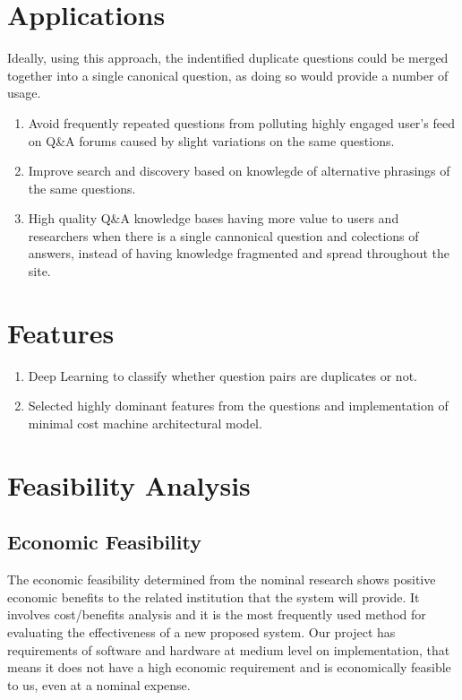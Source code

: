 \section{Applications}
Ideally, using this approach, the indentified duplicate questions could be merged together into a single canonical question, as doing so would provide a number of usage.  
\begin{enumerate}
	\item Avoid frequently repeated questions from polluting highly engaged user's feed on Q\&A forums caused by slight variations on the same questions.
	\item Improve search and discovery based on knowlegde of alternative phrasings of the same questions.
	\item High quality Q\&A knowledge bases having more value to users and researchers when there is a single cannonical question and colections of answers, instead of having knowledge fragmented and spread throughout the site.
\end{enumerate}


\section{Features}
\begin{enumerate}
\item Deep Learning to classify whether question pairs are duplicates or not.
\item Selected highly dominant features from the questions and implementation of minimal cost machine architectural model.
\end{enumerate}


\section{Feasibility Analysis}
\subsection{Economic Feasibility}
The economic feasibility determined from the nominal research shows positive economic benefits to the related institution that the system will provide. It involves cost/benefits analysis and it is the most frequently used method for evaluating the effectiveness of a new proposed system. Our project has requirements of software and hardware at medium level on implementation, that means it does not have a high economic requirement and is economically feasible to us, even at a nominal expense.
\par


